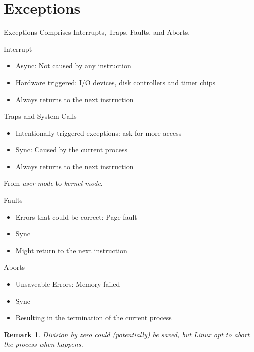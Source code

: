 \documentclass{beamer}
\newtheorem{rmk}{Remark}
\begin{document}
    \section{Exceptions}
    \begin{frame}{Exceptions}
        Comprises Interrupts, Traps, Faults, and Aborts.
    \end{frame}
    \begin{frame}{Interrupt}
        \begin{itemize}
            \item Async: Not caused by any instruction
            \item Hardware triggered: I/O devices, disk controllers and timer chips
            \item Always returns to the next instruction
        \end{itemize}
        
    \end{frame}
    \begin{frame}{Traps and System Calls}
        \begin{itemize}
            \item Intentionally triggered exceptions: ask for more access
            \item Sync: Caused by the current process
            \item Always returns to the next instruction
        \end{itemize}
        From \emph{user mode} to \emph{kernel mode}.
    \end{frame}
    \begin{frame}{Faults}
        \begin{itemize}
            \item Errors that could be correct: Page fault
            \item Sync
            \item Might return to the next instruction
        \end{itemize}
    \end{frame}
    \begin{frame}{Aborts}
        \begin{itemize}
            \item Unsaveable Errors: Memory failed
            \item Sync
            \item Resulting in the termination of the current process
        \end{itemize}
        \begin{rmk}
            Division by zero could (potentially) be saved, but Linux opt to abort the process when happens.
        \end{rmk}
    \end{frame}
\end{document}
